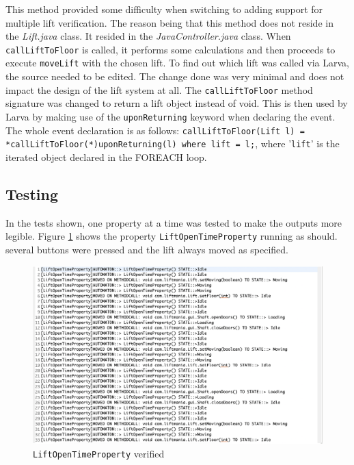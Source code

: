 \documentclass[a4paper, 12pt]{article}
\begin{document}
This method provided some difficulty when switching to adding support for multiple lift verification. The reason being that this method does not reside in the \textit{Lift.java} class. It resided in the \textit{JavaController.java} class. When \texttt{callLiftToFloor} is called, it performs some calculations and then proceeds to execute \texttt{moveLift} with the chosen lift. To find out which lift was called via Larva, the source needed to be edited. The change done was very minimal and does not impact the design of the lift system at all. The \texttt{callLiftToFloor} method signature was changed to return a lift object instead of void. This is then used by Larva by making use of the \texttt{uponReturning} keyword when declaring the event. The whole event declaration is as follows: \newline\texttt{callLiftToFloor(Lift l) = {*callLiftToFloor(*)uponReturning(l)} where {lift = l;}}, where '\texttt{lift}' is the iterated object declared in the FOREACH loop. 

\subsection{Testing}
In the tests shown, one property at a time was tested to make the outputs more legible. Figure \ref{fig:lift-open-test-passed} shows the property \texttt{LiftOpenTimeProperty} running as should. several buttons were pressed and the lift always moved as specified. \\

\begin{figure}[h]
   \centering
   \includegraphics[width=\textwidth,height=\textheight,keepaspectratio]{images/lift-open-test-passed} %
   \caption{\texttt{LiftOpenTimeProperty} verified}
   \label{fig:lift-open-test-passed}
\end{figure}
\end{document}
